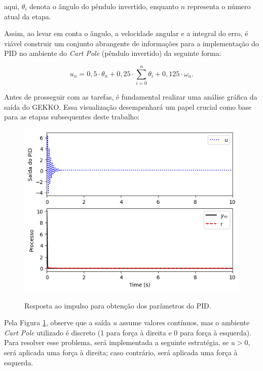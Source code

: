 \documentclass[12pt,           %
a4paper,                       %
openany,                       %
oneside,                       %
chapter=TITLE,                 %
english,                       %
spanish,                       %
brazil,                        %
sumario=tradicional]{abntex2}  %
\begin{document}
\begin{OnehalfSpace}
\noindent aqui, $\theta_i$ denota o ângulo do pêndulo invertido, enquanto $n$ representa o número atual da etapa. 

Assim, ao levar em conta o ângulo, a velocidade angular e a integral do erro, é viável construir um conjunto abrangente de informações para a implementação do PID no ambiente do \textit{Cart Pole} (pêndulo invertido) da seguinte forma:

\begin{equation}
     u_n = 0,5 \cdot \theta_n + 0,25\cdot \sum_{i=0}^n \theta_i + 0,125 \cdot \omega_n.
    \label{eq:39}
\end{equation}

Antes de prosseguir com as tarefas, é fundamental realizar uma análise gráfica da saída do GEKKO. Essa visualização desempenhará um papel crucial como base para as etapas subsequentes deste trabalho:

\begin{figure}[H]
     \centering
     \vspace*{-.2cm}
     \caption{Resposta ao impulso para obtenção dos parâmetros do PID.}
     \includegraphics[scale=.6]{pid.png}
     \label{fig:pid2024}
\end{figure}
\vspace*{-0.8cm}
{\raggedright {}}

Pela Figura \ref{fig:pid2024}, observe que a saída \(u\) assume valores contínuos, mas o ambiente \textit{Cart Pole} utilizado é discreto (1 para força à direita e 0 para força à esquerda). Para resolver esse problema, será implementada a seguinte estratégia, se \(u > 0\), será aplicada uma força à direita; caso contrário, será aplicada uma força à esquerda.


\end{OnehalfSpace}
\end{document}
